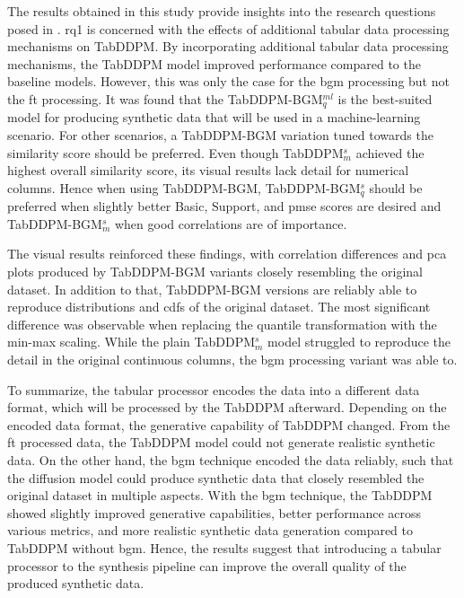 The results obtained in this study provide insights into the research questions posed in .
\gls{rq}1 is concerned with the effects of additional tabular data processing mechanisms on TabDDPM.
By incorporating additional tabular data processing mechanisms, the TabDDPM model improved performance compared to the baseline models.
However, this was only the case for the \gls{bgm} processing but not the \gls{ft} processing.
It was found that the TabDDPM-BGM$^{ml}_q$ is the best-suited model for producing synthetic data that will be used in a machine-learning scenario.
For other scenarios, a TabDDPM-BGM variation tuned towards the similarity score should be preferred.
Even though TabDDPM$^{s}_m$ achieved the highest overall similarity score, its visual results lack detail for numerical columns.
Hence when using TabDDPM-BGM, TabDDPM-BGM$^{s}_q$ should be preferred when slightly better Basic, Support, and \gls{pmse} scores are desired and TabDDPM-BGM$^{s}_m$ when good correlations are of importance.

The visual results reinforced these findings, with correlation differences and \gls{pca} plots produced by TabDDPM-BGM variants closely resembling the original dataset.
In addition to that, TabDDPM-BGM versions are reliably able to reproduce distributions and \glspl{cdf} of the original dataset.
The most significant difference was observable when replacing the quantile transformation with the min-max scaling.
While the plain TabDDPM$^s_m$ model struggled to reproduce the detail in the original continuous columns, the \gls{bgm} processing variant was able to.

To summarize, the tabular processor encodes the data into a different data format, which will be processed by the TabDDPM afterward.
Depending on the encoded data format, the generative capability of TabDDPM changed.
From the \gls{ft} processed data, the TabDDPM model could not generate realistic synthetic data.
On the other hand, the \gls{bgm} technique encoded the data reliably, such that the diffusion model could produce synthetic data that closely resembled the original dataset in multiple aspects.
With the \gls{bgm} technique, the TabDDPM showed slightly improved generative capabilities, better performance across various metrics, and more realistic synthetic data generation compared to TabDDPM without \gls{bgm}.
Hence, the results suggest that introducing a tabular processor to the synthesis pipeline can improve the overall quality of the produced synthetic data.
\newpage

